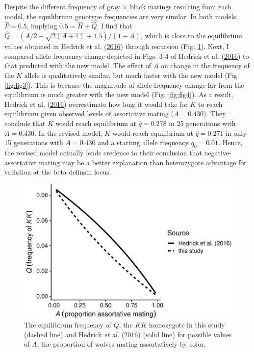 \documentclass[
]{article}
\begin{document}
Despite the different frequency of gray \(\times\) black matings resulting from each model, the equilibrium genotype frequencies are very similar. In both models, \(\hat{P} = 0.5\), implying \(0.5 = \hat{H} + \hat{Q}\). I find that \(\hat{Q} = (A / 2 - \sqrt{2 (A + 1)} + 1.5)/(1 - A)\), which is close to the equilibrium values obtained in Hedrick et al. (\protect\hyperlink{ref-hedrick_negative-assortative_2016}{2016}) through recursion (Fig. \ref{fig:fig2}). Next, I compared allele frequency change depicted in Figs. 3-4 of Hedrick et al. (\protect\hyperlink{ref-hedrick_negative-assortative_2016}{2016}) to that predicted with the new model. The effect of \(A\) on change in the frequency of the \(K\) allele is qualitatively similar, but much faster with the new model (Fig. \ref{fig:fig3}). This is because the magnitude of allele frequency change far from the equilibrium is much greater with the new model (Fig. \ref{fig:fig4}). As a result, Hedrick et al. (\protect\hyperlink{ref-hedrick_negative-assortative_2016}{2016}) overestimate how long it would take for \(K\) to reach equilibrium given observed levels of assortative mating (\(A = 0.430\)). They conclude that \(K\) would reach equilibrium at \(\hat{q} = 0.278\) in 25 generations with \(A = 0.430\). In the revised model, \(K\) would reach equilibrium at \(\hat{q} = 0.271\) in only 15 generations with \(A = 0.430\) and a starting allele frequency \(q_0 = 0.01\). Hence, the revised model actually lends credence to their conclusion that negative-assortative mating may be a better explanation than heterozygote advantage for variation at the beta definsin locus.

\begin{figure}

{\centering \includegraphics{ms_files/figure-latex/fig2-1} 

}

\caption{The equilibirum frequency of $Q$, the $\mathit{KK}$ homozygote in this study (dashed line) and Hedrick \textit{et al.} (2016) (solid line) for possible values of $A$, the proportion of wolves mating assortatively by color.}\label{fig:fig2}
\end{figure}
\end{document}
